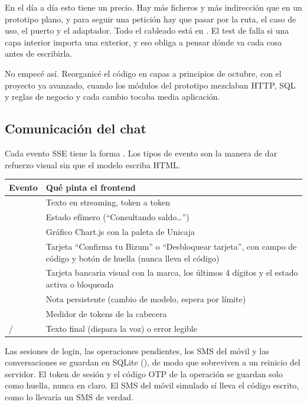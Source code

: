 En el día a día esto tiene un precio. Hay más ficheros y más indirección que en un prototipo plano, y para seguir una
petición hay que pasar por la ruta, el caso de uso, el puerto y el adaptador. Todo el cableado está en
. El test de 
falla si una capa interior importa una exterior, y eso obliga a pensar dónde va cada cosa antes de escribirla.

No empecé así. Reorganicé el código en capas a principios de octubre, con el proyecto ya avanzado, cuando los módulos
del prototipo mezclaban HTTP, SQL y reglas de negocio y cada cambio tocaba media aplicación.

\subsection{Comunicación del chat}\label{sec:comunicacion}

Cada evento SSE tiene la forma . Los tipos de evento son la manera de dar
refuerzo visual sin que el modelo escriba HTML.

{\small
\begin{tabularx}{\textwidth}{@{}P{3.2cm}L@{}}
\toprule
\textbf{Evento} & \textbf{Qué pinta el frontend} \\
\midrule
{} & Texto en streaming, token a token \\
 & Estado efímero (``Consultando saldo…'') \\
 & Gráfico Chart.js con la paleta de Unicaja \\
 & Tarjeta ``Confirma tu Bizum'' o ``Desbloquear tarjeta'', con campo de código y botón de huella (nunca lleva el código) \\
 & Tarjeta bancaria visual con la marca, los últimos 4 dígitos y el estado activa o bloqueada \\
 & Nota persistente (cambio de modelo, espera por límite) \\
 & Medidor de tokens de la cabecera \\
 /  & Texto final (dispara la voz) o error legible \\
\bottomrule
\end{tabularx}}

Las sesiones de login, las operaciones pendientes, los SMS del móvil y las conversaciones se guardan en SQLite
(), de modo que sobreviven a un reinicio del servidor. El token de sesión y el
código OTP de la operación se guardan solo como huella, nunca en claro. El SMS del móvil simulado sí lleva el código
escrito, como lo llevaría un SMS de verdad.

